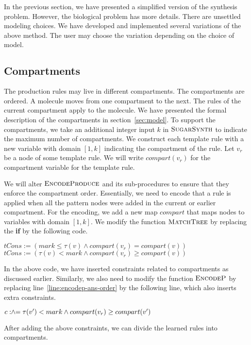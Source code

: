 In the previous section, we have presented a simplified version of
the synthesis problem.
However, the biological problem has more details.
There are unsettled modeling choices.
We have developed and implemented several variations of the
above method.
The user may choose the variation depending on the choice of model.

\subsection{Compartments}

The production rules may live in different compartments.
The compartments are ordered.
A molecule moves from one compartment to the next.
The rules of the current compartment apply to the molecule.
We have presented the formal description of the compartments in
section~\ref{sec:model}.
To support the compartments, we take an additional integer
input $k$ in $\textsc{SugarSynth}$ to indicate the maximum number
of compartments.
We construct each template rule with a new variable with domain $[1,k]$
indicating the compartment of the rule.
Let $v_r$ be a node of some template rule. We will write $compart(v_r)$
for the compartment variable for the template rule.

We will alter $\textsc{EncodeProduce}$ and its sub-procedures to
ensure that they enforce the compartment order.
Essentially, we need to encode that a rule is applied when all the
pattern nodes were added in the current or earlier compartment.
For the encoding, we add a new map $compart$ that maps
nodes to variables with domain $[1,k]$.
We modify the function $\textsc{MatchTree}$ by replacing
the {\bf if} by the following code.
\begin{algorithmic}[1]
  \vspace{1ex}
   \State $tCons := ( mark \leq \tau(v)  \land compart(v_r) = compart(v) )$
  \Else
   \State $tCons := ( \tau(v) < mark  \land compart(v_r) \geq compart(v) )$
   \EndIf
   \vspace{1ex}
\end{algorithmic}
In the above code, we have inserted constraints related to compartments
as discussed earlier.
Similarly, we also need to modify the function
$\textsc{EncodeP}$ by replacing line~\ref{line:encodep-ans-order}
by the following line, which also inserts extra constraints.
\begin{algorithmic}[1]
  \vspace{1ex}
  \State $c \mathrel{:\hspace{-3pt}\land\hspace{-3pt}=} \tau(v') < mark \land compart(v_r) \geq compart(v')$
  \vspace{1ex}
\end{algorithmic}
After adding the above constraints, we can divide the learned rules
into compartments.

